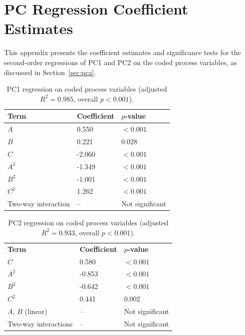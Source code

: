 \documentclass[MScDSA]{uccthesis}
\begin{document}
\chapter{PC Regression Coefficient Estimates}
\label{app:pc_regression_coefficients}
This appendix presents the coefficient estimates and significance tests for the second-order regressions of PC1 and PC2 on the coded process variables, as discussed in Section~\ref{sec:pca}.

\begin{table}[H]
    \centering
    \caption{PC1 regression on coded process variables (adjusted $R^2 = 0.985$, overall $p < 0.001$).}
    \label{tab:pc1_regression}
    \begin{tabular}{lll}
    \toprule
    \textbf{Term} & \textbf{Coefficient} & \textbf{$p$-value} \\
    \midrule
    $A$ & 0.550 & $<0.001$ \\
    $B$ & 0.221 & 0.028 \\ 
    $C$ & -2.060 & $<0.001$ \\
    $A^2$ & -1.349 & $<0.001$ \\
    $B^2$ & -1.001 & $<0.001$ \\
    $C^2$ & 1.262 & $<0.001$ \\
    Two-way interaction & -- & Not significant \\
    \bottomrule
    \end{tabular}
    \end{table}

    
\begin{table}[H]
    \centering
    \caption{PC2 regression on coded process variables (adjusted $R^2 = 0.933$, overall $p < 0.001$).}
    \label{tab:pc2_regression}
    \begin{tabular}{lll}
    \toprule
    \textbf{Term} & \textbf{Coefficient} & \textbf{$p$-value} \\
    $C$ & 0.580 & $<0.001$ \\
    $A^2$ & -0.853 & $<0.001$ \\ 
    $B^2$ & -0.642 & $<0.001$ \\
    $C^2$ & 0.441 & 0.002 \\
    $A$, $B$ (linear) & -- & Not significant \\
    Two-way interactions & -- & Not significant \\
    \bottomrule
    \end{tabular}
    \end{table}  
\end{document}
